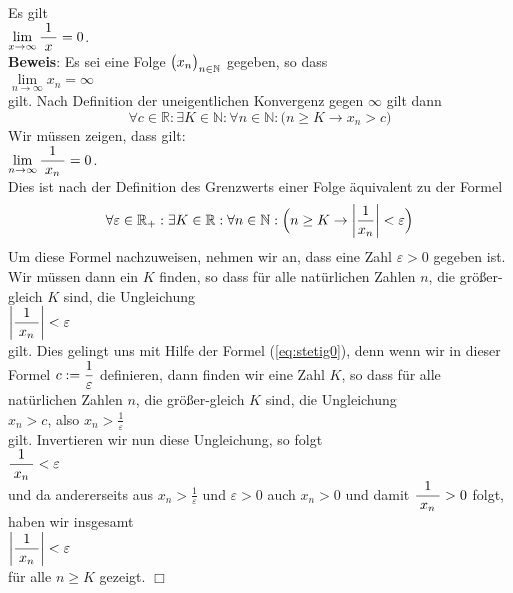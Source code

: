 \example 
Es gilt
\\[0.2cm]
\hspace*{1.3cm}      
$\lim\limits_{x\rightarrow\infty} \displaystyle\frac{\;\displaystyle1\;}{\;\displaystyle x\;} = 0$.
\\[0.2cm]
\textbf{Beweis}:  Es sei eine Folge $\bigl(x_n\bigr)_{n\in\mathbb{N}}$ gegeben, so dass 
\\[0.2cm]
\hspace*{1.3cm}      
$\lim\limits_{n\rightarrow\infty} x_n = \infty$
\\[0.2cm]
gilt.   Nach Definition der uneigentlichen Konvergenz gegen $\infty$ gilt dann
\begin{equation}
  \label{eq:stetig0}  
  \forall c \in \mathbb{R}: \exists K \in \mathbb{N}:\forall n \in \mathbb{N}: \bigl(n \geq K \rightarrow x_n > c\bigr)
\end{equation}
Wir m\"ussen zeigen, dass gilt:
\\[0.2cm]
\hspace*{1.3cm}
$\displaystyle \lim\limits_{n\rightarrow\infty} \displaystyle\frac{\;\displaystyle1\;}{\;\displaystyle x_n\;} = 0$.
\\[0.2cm]
Dies ist nach der Definition des Grenzwerts einer Folge \"aquivalent zu der Formel
\begin{equation}
  \label{eq:stetig1}
  \forall \varepsilon \in\mathbb{R}_+: \exists K \in \mathbb{R} : \forall n \in \mathbb{N}
  :\Bigl(n \geq K \rightarrow \left|\frac{1}{x_n}\right| < \varepsilon\Bigr)
\end{equation}
Um diese Formel nachzuweisen, nehmen wir an, dass eine Zahl $\varepsilon>0$
gegeben ist.  Wir m\"ussen dann ein $K$ finden, so dass f\"ur alle nat\"urlichen Zahlen $n$, die
gr\"o{\ss}er-gleich $K$ sind, die Ungleichung 
\\[0.2cm]
\hspace*{1.3cm} $\left|\displaystyle\frac{\;\displaystyle1\;}{\;\displaystyle x_n\;}\right| < \varepsilon$
\\[0.2cm]
gilt.  Dies gelingt uns mit Hilfe der Formel (\ref{eq:stetig0}), denn wenn wir in dieser Formel
$\displaystyle c := \frac{1}{\varepsilon}$ definieren, dann finden wir eine Zahl $K$, so dass f\"ur alle
nat\"urlichen Zahlen $n$, die
gr\"o{\ss}er-gleich $K$ sind, die Ungleichung  
\\[0.2cm] \hspace*{1.3cm} $\displaystyle x_n > c$, \quad also $\displaystyle x_n > \frac{1}{\varepsilon}$ \\[0.2cm]
gilt.  Invertieren wir nun diese Ungleichung, so folgt
\\[0.2cm]
\hspace*{1.3cm}
$\displaystyle\frac{\;\displaystyle1\;}{\;\displaystyle x_n\;} < \varepsilon$
\\[0.2cm]
und da andererseits aus $x_n > \frac{1}{\varepsilon}$ und $\varepsilon > 0$ auch $x_n > 0$
und damit $\displaystyle\frac{\;\displaystyle1\;}{\;\displaystyle x_n\;} > 0$ folgt, haben wir insgesamt 
\\[0.2cm]
\hspace*{1.3cm}
$\left|\displaystyle\frac{\;\displaystyle1\;}{\;\displaystyle x_n\;}\right| < \varepsilon$
\\[0.2cm]
f\"ur alle $n \geq K$ gezeigt. \hspace*{\fill} $\Box$
\vspace*{0.3cm}

